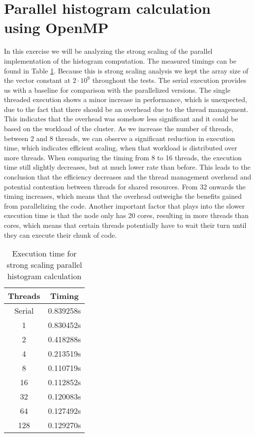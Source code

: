 \section{Parallel histogram calculation using OpenMP}
In this exercise we will be analyzing the strong scaling of the parallel implementation of the histogram computation. The measured timings can be found in Table \ref{tab:hist-scaling}.
Because this is strong scaling analysis we kept the array size of the vector constant at $2 \cdot 10^9$ throughout the tests.\newline
The serial execution provides us with a baseline for comparison with the parallelized versions.
The single threaded execution shows a minor increase in performance, which is unexpected, due to the fact that there should be an overhead due to the thread management. This  indicates that the overhead was somehow less significant and it could be based on the workload of the cluster.
As we increase the number of threads, between 2 and 8 threads, we can observe a significant reduction in execution time, which indicates efficient scaling, when that workload is distributed over more threads.\newline
When comparing the timing from 8 to 16 threads, the execution time still slightly decreases, but at much lower rate than before. This leads to the conclusion that the efficiency decreases and the thread management overhead and potential contention between threads for shared resources.\newline
From 32 onwards the timing increases, which means that the overhead outweighs the benefits gained from parallelizing the code. Another important factor that plays into the slower execution time is that the node only has 20 cores, resulting in more threads than cores, which means that certain threads potentially have to wait their turn until they can execute their chunk of code.
\begin{table}[H]
	\centering
	\begin{tabular}{|c|c|}
		\hline
		\textbf{Threads} & \textbf{Timing} \\ \hline
		Serial           & 0.839258s       \\ \hline
		1                & 0.830452s       \\ \hline
		2                & 0.418288s       \\ \hline
		4                & 0.213519s       \\ \hline
		8                & 0.110719s       \\ \hline
		16               & 0.112852s       \\ \hline
		32               & 0.120083s       \\ \hline
		64               & 0.127492s       \\ \hline
		128              & 0.129270s        \\ \hline
	\end{tabular}
	\caption{Execution time for strong scaling parallel histogram calculation}
	\label{tab:hist-scaling}
\end{table}

